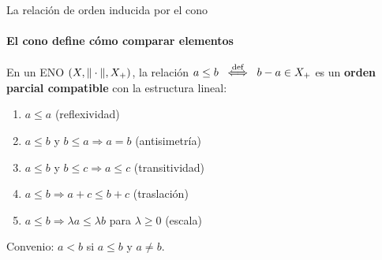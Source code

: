 \begin{frame}{La relación de orden inducida por el cono}
\framesubtitle{El cono define cómo comparar elementos}

\begin{theorem}
En un ENO $(X,\|\cdot\|,X_{+})$, la relación
$a\le b \;\overset{\text{def}}{\iff}\; b-a\in X_{+}$
es un \textbf{orden parcial compatible} con la estructura lineal:
\begin{enumerate}[(1)]
    \item $a\le a$ \hfill (reflexividad)
    \item $a\le b$ y $b\le a \Rightarrow a=b$ \hfill (antisimetría)
    \item $a\le b$ y $b\le c \Rightarrow a\le c$ \hfill (transitividad)
    \item $a\le b \Rightarrow a+c\le b+c$ \hfill (traslación)
    \item $a\le b \Rightarrow \lambda a\le\lambda b$ para $\lambda\ge 0$ \hfill (escala)
\end{enumerate}
\end{theorem}

\smallskip
Convenio: $a<b$ si $a\le b$ y $a\ne b$.

\end{frame}


